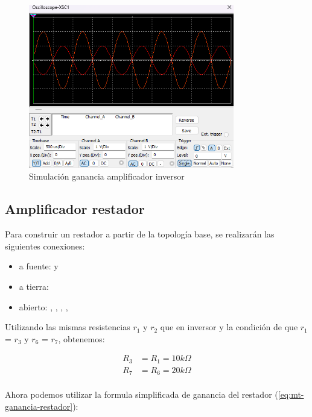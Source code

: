 \begin{figure}[ht]
    \centering
    \includegraphics[width=0.8\textwidth]{src/images/simulaciones/amp-inversor-ganancia.png}
    \caption{Simulación ganancia amplificador inversor}
    \label{fig:sim-amp-inversor-ganancia}
\end{figure}

\subsection{Amplificador restador}

Para construir un restador a partir de la topología base, se realizarán las siguientes conexiones:

\begin{itemize}
    \item a fuente:  y 
    \item a tierra: 
    \item abierto: , , , , 
\end{itemize}

\newcommand{\res}[1]{$r_{#1}$}

Utilizando las mismas resistencias \res{1} y \res{2} que en inversor  y la condición de que \res{1} = \res{3} y \res{6} = \res{7}, obtenemos:  

\begin{align*}
    R_3 &= R_1 = 10k\Omega \\
    R_7 &= R_6 = 20k\Omega \\
\end{align*}

Ahora podemos utilizar la formula simplificada de ganancia del restador (\ref{eq:mt-ganancia-restador}):


